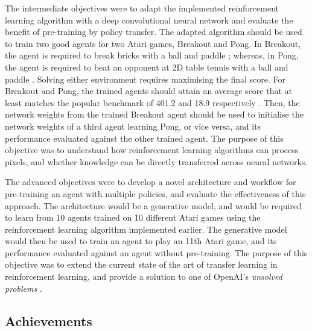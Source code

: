 \documentclass[12pt,a4paper]{article}
\begin{document}
The intermediate objectives were to adapt the implemented reinforcement learning algorithm with a deep convolutional neural network and evaluate the benefit of pre-training by policy transfer. The adapted algorithm should be used to train two good agents for two Atari games, Breakout and Pong. In Breakout, the agent is required to break bricks with a ball and paddle \cite{}; whereas, in Pong, the agent is required to beat an opponent at 2D table tennis with a ball and paddle \cite{}. Solving either environment requires maximising the final score. For Breakout and Pong, the trained agents should attain an average score that at least matches the popular benchmark of 401.2 and 18.9 respectively \cite{}. Then, the network weights from the trained Breakout agent should be used to initialise the network weights of a third agent learning Pong, or vice versa, and its performance evaluated against the other trained agent. The purpose of this objective was to understand how reinforcement learning algorithms can process pixels, and whether knowledge can be directly transferred across neural networks.

The advanced objectives were to develop a novel architecture and workflow for pre-training an agent with multiple policies, and evaluate the effectiveness of this approach. The architecture would be a generative model, and would be required to learn from 10 agents trained on 10 different Atari games using the reinforcement learning algorithm implemented earlier. The generative model would then be used to train an agent to play an 11th Atari game, and its performance evaluated against an agent without pre-training. The purpose of this objective was to extend the current state of the art of transfer learning in reinforcement learning, and provide a solution to one of OpenAI's \textit{unsolved problems} \cite{}.

\subsection{Achievements}
\end{document}
